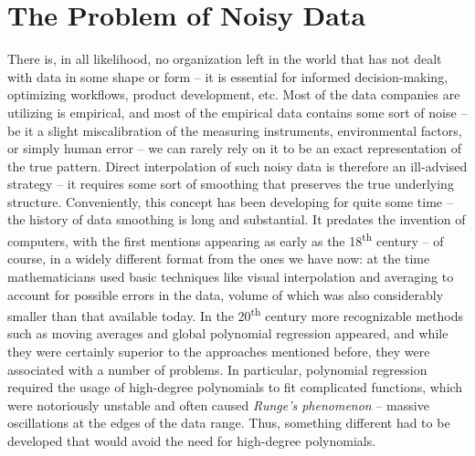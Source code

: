 \documentclass[11pt,leqno]{book}
\theoremstyle{definition}
\theoremstyle{plain}
\theoremstyle{definition}
\begin{document}
{\section{The Problem of Noisy Data}
There is, in all likelihood, no organization left in the world that has not dealt with data in some shape or form -- it is essential for informed decision-making, optimizing workflows, product development, etc. Most of the data companies are utilizing is empirical, and most of the empirical data contains some sort of noise -- be it a slight miscalibration of the measuring instruments, environmental factors, or simply human error -- we can rarely rely on it to be an exact representation of the true pattern. Direct interpolation of such noisy data is therefore an ill-advised strategy -- it requires some sort of smoothing that preserves the true underlying structure. Conveniently, this concept has been developing for quite some time -- the history of data smoothing is long and substantial. It predates the invention of computers, with the first mentions appearing as early as the 18\textsuperscript{th} century \cite{smoothistory} -- of course, in a widely different format from the ones we have now: at the time mathematicians used basic techniques like visual interpolation and averaging to account for possible errors in the data, volume of which was also considerably smaller than that available today. In the 20\textsuperscript{th} century more recognizable methods such as moving averages and global polynomial regression appeared, and while they were certainly superior to the approaches mentioned before, they were associated with a number of problems. In particular, polynomial regression required the usage of high-degree polynomials to fit complicated functions, which were notoriously unstable and often caused \textit{Runge's phenomenon} -- massive oscillations at the edges of the data range. Thus, something different had to be developed that would avoid the need for high-degree polynomials.
}
\end{document}
